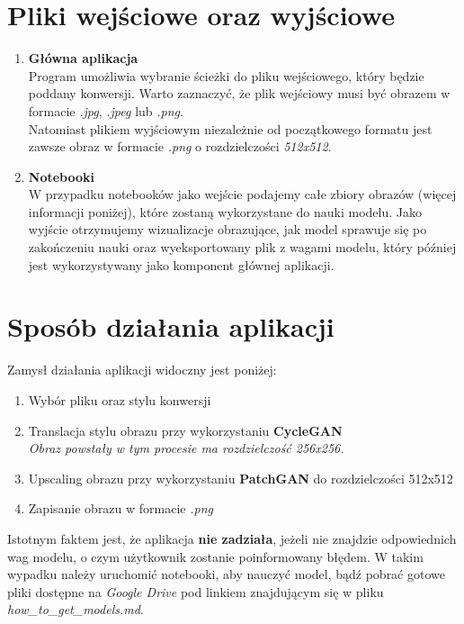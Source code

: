\documentclass{article}
\begin{document}
\section{Pliki wejściowe oraz wyjściowe}
\begin{enumerate}[label=\arabic*.]
    \item \textbf{Główna aplikacja} \\
Program umożliwia wybranie ścieżki do pliku wejściowego, który będzie poddany konwersji. Warto zaznaczyć, że plik wejściowy musi być obrazem w formacie \textit{.jpg}, \textit{.jpeg} lub \textit{.png}.
\vspace{3mm} \\
Natomiast plikiem wyjściowym niezależnie od początkowego formatu jest zawsze obraz w formacie \textit{.png} o rozdzielczości \textit{512x512}.
    \item \textbf{Notebooki} \\
W przypadku notebooków jako wejście podajemy całe zbiory obrazów (więcej informacji poniżej), które zostaną wykorzystane do nauki modelu. Jako wyjście otrzymujemy wizualizacje obrazujące, jak model sprawuje się po zakończeniu nauki oraz wyeksportowany plik z wagami modelu, który później jest wykorzystywany jako komponent głównej aplikacji.
\end{enumerate}

\section{Sposób działania aplikacji}
Zamysł działania aplikacji widoczny jest poniżej:
\begin{enumerate}[label=\arabic*.]
    \item Wybór pliku oraz stylu konwersji
    \item Translacja stylu obrazu przy wykorzystaniu \textbf{CycleGAN} \\
\textit{Obraz powstały w tym procesie ma rozdzielczość 256x256.}
    \item Upscaling obrazu przy wykorzystaniu \textbf{PatchGAN} do rozdzielczości 512x512
    \item Zapisanie obrazu w formacie \textit{.png}
\end{enumerate}
Istotnym faktem jest, że aplikacja \textbf{nie zadziała}, jeżeli nie znajdzie odpowiednich wag modelu, o czym użytkownik zostanie poinformowany błędem.
W takim wypadku należy uruchomić notebooki, aby nauczyć model, bądź pobrać gotowe pliki dostępne na \textit{Google Drive} pod linkiem znajdującym się w pliku \textit{how\_to\_get\_models.md}. 
\end{document}
